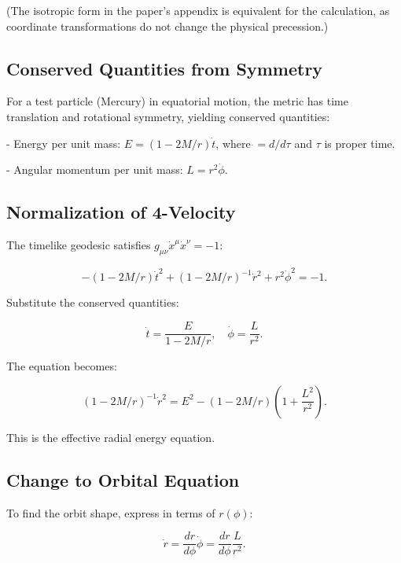 \documentclass{article}
\begin{document}
(The isotropic form in the paper's appendix is equivalent for the calculation, as coordinate transformations do not change the physical precession.)

\subsection{Conserved Quantities from Symmetry}

For a test particle (Mercury) in equatorial motion, the metric has time translation and rotational symmetry, yielding conserved quantities:

- Energy per unit mass: \( E = (1 - 2M/r) \dot{t} \), where \(\dot{} = d/d\tau\) and \(\tau\) is proper time.

- Angular momentum per unit mass: \( L = r^2 \dot{\phi}\).

\subsection{Normalization of 4-Velocity}

The timelike geodesic satisfies \(g_{\mu\nu} \dot{x}^\mu \dot{x}^\nu = -1\):

\begin{equation}
 - (1 - 2M/r) \dot{t}^2 + (1 - 2M/r)^{-1} \dot{r}^2 + r^2 \dot{\phi}^2 = -1.
\end{equation}

Substitute the conserved quantities:

\begin{equation}
\dot{t} = \frac{E}{1 - 2M/r}, \quad \dot{\phi} = \frac{L}{r^2}.
\end{equation}

The equation becomes:

\begin{equation}
 (1 - 2M/r)^{-1} \dot{r}^2 = E^2 - (1 - 2M/r) \left(1 + \frac{L^2}{r^2}\right).
\end{equation}

This is the effective radial energy equation.

\subsection{Change to Orbital Equation}

To find the orbit shape, express in terms of \(r(\phi)\):

\begin{equation}
 \dot{r} = \frac{dr}{d\phi} \dot{\phi} = \frac{dr}{d\phi} \frac{L}{r^2}.
\end{equation}
\end{document}
